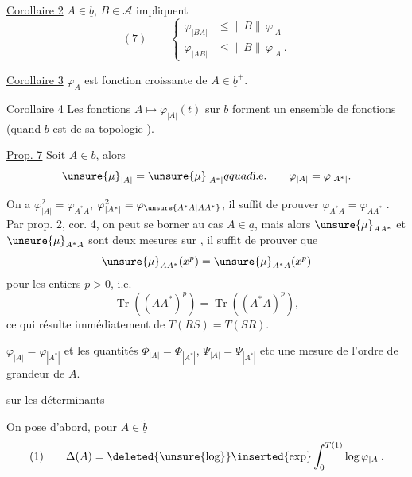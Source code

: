 \uline{Corollaire 2} $A\in\underline b$, $B\in\mathcal A$ impliquent
\[
(7)\qquad
\left\{\begin{aligned}
\varphi_{|BA|}&\leq\|B\|\,\varphi_{|A|}\\
\varphi_{|AB|}&\leq\|B\|\,\varphi_{|A|}.
\end{aligned}\right.
\]

\uline{Corollaire 3} $\varphi_A$ est fonction croissante de $A\in\underline b^+$.

\uline{Corollaire 4} Les fonctions $A\longmapsto\varphi_{|A|}^-(t)$ sur $\underline b$ forment un ensemble  de fonctions (quand $\underline b$ est  de sa topologie ).
\margin{$\Big|$}


\uline{Prop. 7} Soit $A\in\underline b$, alors
\margin{$\Big|$}
\[
\unsure{\mu}_{|A|}=\unsure{\mu}_{|A^*|}qquad\text{i.e.}\qquad
\varphi_{|A|}=\varphi_{|A^*|}.
\]

On a $\varphi_{|A|}^{2}=\varphi_{A^*A}$, $\varphi_{|A^*|}^{2}=\varphi_{\unsure{A^*A|AA^*}}$, il suffit de prouver $\varphi_{A^*A}=\varphi_{AA^*}$  . Par prop. 2, cor. 4, on peut se borner au cas $A\in\underline a$, mais alors  $\unsure{\mu}_{AA^*}$ et $\unsure{\mu}_{A^*A}$ sont deux mesures   sur \deleted{$[0,+\infty[$} , il suffit de prouver que
\[
\unsure{\mu}_{AA^*}(x^p)=\unsure{\mu}_{A^*A}(x^p)
\]
pour les entiers $p>0$, i.e.
\[
\operatorname{Tr}((AA^*)^p)=\operatorname{Tr}((A^*A)^p),
\]
ce qui résulte immédiatement de $T(RS)=T(SR)$.

$\varphi_{|A|}=\varphi_{|A^*|}$ et les quantités 
$\Phi_{|A|}=\Phi_{|A^*|}$, $\Psi_{|A|}=\Psi_{|A^*|}$ etc     une mesure de l'ordre de grandeur de $A$.

\quad\uline{ sur les déterminants}

 On pose  d'abord, pour $A\in\widetilde{\underline b}$
\[
(1)\qquad\Delta(A)=\deleted{\unsure{\log}}\inserted{\exp}\int_0^{T(1)}\log\varphi_{|A|}.
\]
  

